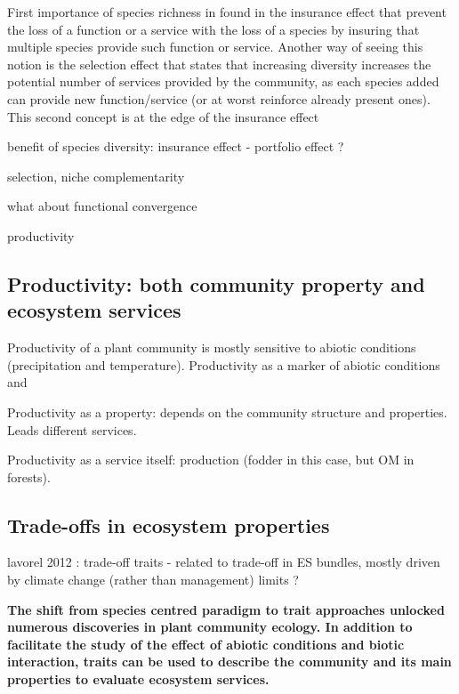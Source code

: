 First importance of species richness in found in the insurance effect that prevent the loss of a function or a service with the loss of a species by insuring that multiple species provide such function or service. Another way of seeing this notion is the selection effect that states that increasing diversity increases the potential number of services provided by the community, as each species added can provide new function/service (or at worst reinforce already present ones). This second concept is at the edge of the insurance effect

benefit of species diversity: insurance effect - portfolio effect ?

selection, niche complementarity

what about functional convergence

productivity 

\textbf{}

\subsection{Productivity: both community property and ecosystem services}

Productivity of a plant community is mostly sensitive to abiotic conditions (precipitation and temperature). 
Productivity as a marker of abiotic conditions and 

Productivity as a property: depends on the community structure and properties. Leads different services.

Productivity as a service itself: production (fodder in this case, but OM in forests).

\textbf{}

\subsection{Trade-offs in ecosystem properties}

lavorel 2012 : trade-off  \parencite{lavorel_how_2012}
traits - related to trade-off in ES bundles, mostly driven by climate change (rather than management) \parencite{lamarque_plant_2014} limits ?


\textbf{The shift from species centred paradigm to trait approaches unlocked numerous discoveries in plant community ecology. In addition to facilitate the study of the effect of abiotic conditions and biotic interaction, traits can be used to describe the community and its main properties to evaluate ecosystem services.}

